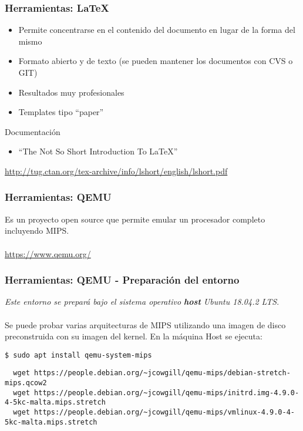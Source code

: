 \documentclass{beamer}
\begin{document}
 \begin{frame}
 \frametitle{Herramientas: \LaTeX}
 \begin{itemize} 
    \item Permite concentrarse en el contenido
del documento en lugar de la forma del
mismo
    \item Formato abierto y de texto (se pueden
mantener los documentos con CVS o GIT)
    \item Resultados muy profesionales
    \item Templates tipo “paper”
  \end{itemize}

  Documentación
  \begin{itemize}
   \item “The Not So Short Introduction To LaTeX”
  \end{itemize}
  \url{http://tug.ctan.org/tex-archive/info/lshort/english/lshort.pdf}
 \end{frame}
 
  \begin{frame}
 \frametitle{Herramientas: QEMU}
Es un proyecto open source que permite emular un procesador completo incluyendo MIPS.\\~\\

\url{https://www.qemu.org/}
  \end{frame}

  
\begin{frame}[fragile]
 \frametitle{Herramientas: QEMU - Preparación del entorno}
\textit{Este entorno se prepará bajo el sistema operativo \textbf{host} Ubuntu 18.04.2 LTS}.\\~\\

 Se puede probar varias arquitecturas de MIPS utilizando una imagen de disco preconstruida con su imagen del kernel. En la máquina Host se ejecuta:
\begin{lstlisting}
$ sudo apt install qemu-system-mips
\end{lstlisting}

 \begin{lstlisting}
  wget https://people.debian.org/~jcowgill/qemu-mips/debian-stretch-mips.qcow2
  wget https://people.debian.org/~jcowgill/qemu-mips/initrd.img-4.9.0-4-5kc-malta.mips.stretch
  wget https://people.debian.org/~jcowgill/qemu-mips/vmlinux-4.9.0-4-5kc-malta.mips.stretch
 \end{lstlisting}
\end{frame}  
\end{document}
